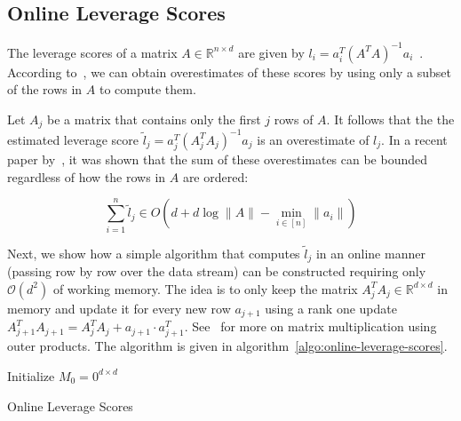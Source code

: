 \newpage

\subsection{Online Leverage Scores}

The leverage scores of a matrix $A \in \mathbb{R}^{n \times d}$
are given by $l_i = a_i^T (A^TA)^{-1}a_i$~\cite{online-row-sampling}.
According to~\cite{online-row-sampling}, we can obtain overestimates
of these scores by using only a subset of the rows in $A$ to compute them.

Let $A_j$ be a matrix that contains only the first $j$ rows of $A$.
It follows that the the estimated leverage score
$\tilde{l}_j = a_j^T (A_j^TA_j)^{-1}a_j$ is an overestimate of $l_j$.
In a recent paper by~\cite{tensor-factorization}, it was shown that
the sum of these overestimates can be bounded regardless of how
the rows in $A$ are ordered:
\begin{lemma}
    \begin{equation*}
        \sum_{i=1}^n \tilde{l}_j \in O(d + d \log \lVert A \rVert - \min_{i \in [n]} \lVert a_i \rVert)
    \end{equation*}
\end{lemma}

Next, we show how a simple algorithm that computes $\tilde{l}_j$ in an
online manner (passing row by row over the data stream)
can be constructed requiring only $\mathcal{O}(d^2)$ of working memory.
The idea is to only keep the matrix $A_j^TA_j \in \mathbb{R}^{d \times d}$
in memory and update it
for every new row $a_{j+1}$ using a rank one update
$A_{j+1}^TA_{j+1} = A_j^TA_j + a_{j+1} \cdot a_{j+1}^T$.
See~\cite{matrix-computations} for more on matrix multiplication using
outer products. The algorithm is given in algorithm~\ref{algo:online-leverage-scores}.

\begin{algorithm}
    \DontPrintSemicolon
    Initialize $M_0 = 0^{d \times d}$ \;
    \caption{Online Leverage Scores\label{algo:online-leverage-scores}}
\end{algorithm}
